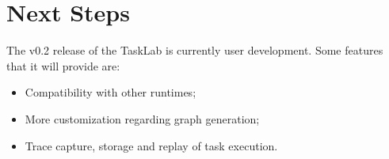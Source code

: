 \section{Next Steps}
The v0.2 release of the TaskLab is currently user development. Some features that it will provide are:
 \begin{itemize}
\item Compatibility with other runtimes;
\item More customization regarding graph generation;
\item Trace capture, storage and replay of task  execution. 
\end{itemize}

 



